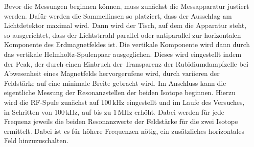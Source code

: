 Bevor die Messungen beginnen können, muss zunächst die Messapparatur justiert werden. Dafür werden die Sammellinsen so platziert, dass der Ausschlag am Lichtdetektor maximal wird.
Dann wird der Tisch, auf dem die Apparatur steht, so ausgerichtet, dass der Lichtstrrahl parallel oder antiparallel zur horizontalen Komponente des Erdmagnetfeldes ist.
Die vertikale Komponente wird dann durch das vertikale Helmholtz-Spulenpaar ausgeglichen. Dieses wird eingestellt indem der Peak, der durch einen Einbruch der Transparenz
der Rubidiumdampfzelle bei Abwesenheit eines Magnetfelds hervorgerufene wird, durch variieren der Feldstärke auf eine minimale Breite gebracht wird. 
\newline \newline
Im Anschluss kann die eigentliche Messung der Resonanzstellen der beiden Isotope beginnen. Hierzu wird die RF-Spule zunächst auf $100\, \si{\kilo\hertz}$ eingestellt und im
Laufe des Versuches, in Schritten von $100\, \si{\kilo\hertz}$, auf bis zu $1\,\si{\mega\hertz}$ erhöht. Dabei werden für jede Frequenz jeweils die beiden Resonanzwerte der
Feldstärke für die zwei Isotope ermittelt. Dabei ist es für höhere Frequenzen nötig, ein zusätzliches horizontales Feld hinzuzuschalten.
